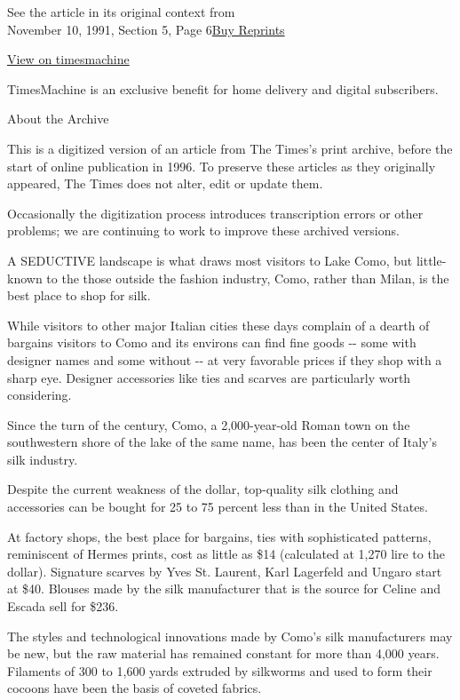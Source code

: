 See the article in its original context from\\
November 10, 1991, Section 5, Page
6\href{https://store.nytimes.com/collections/new-york-times-page-reprints?utm_source=nytimes\&utm_medium=article-page\&utm_campaign=reprints}{Buy
Reprints}

\href{http://timesmachine.nytimes.com/timesmachine/1991/11/10/531491.html}{View
on timesmachine}

TimesMachine is an exclusive benefit for home delivery and digital
subscribers.

About the Archive

This is a digitized version of an article from The Times's print
archive, before the start of online publication in 1996. To preserve
these articles as they originally appeared, The Times does not alter,
edit or update them.

Occasionally the digitization process introduces transcription errors or
other problems; we are continuing to work to improve these archived
versions.

A SEDUCTIVE landscape is what draws most visitors to Lake Como, but
little-known to the those outside the fashion industry, Como, rather
than Milan, is the best place to shop for silk.

While visitors to other major Italian cities these days complain of a
dearth of bargains visitors to Como and its environs can find fine goods
-\/- some with designer names and some without -\/- at very favorable
prices if they shop with a sharp eye. Designer accessories like ties and
scarves are particularly worth considering.

Since the turn of the century, Como, a 2,000-year-old Roman town on the
southwestern shore of the lake of the same name, has been the center of
Italy's silk industry.

Despite the current weakness of the dollar, top-quality silk clothing
and accessories can be bought for 25 to 75 percent less than in the
United States.

At factory shops, the best place for bargains, ties with sophisticated
patterns, reminiscent of Hermes prints, cost as little as \$14
(calculated at 1,270 lire to the dollar). Signature scarves by Yves St.
Laurent, Karl Lagerfeld and Ungaro start at \$40. Blouses made by the
silk manufacturer that is the source for Celine and Escada sell for
\$236.

The styles and technological innovations made by Como's silk
manufacturers may be new, but the raw material has remained constant for
more than 4,000 years. Filaments of 300 to 1,600 yards extruded by
silkworms and used to form their cocoons have been the basis of coveted
fabrics.

